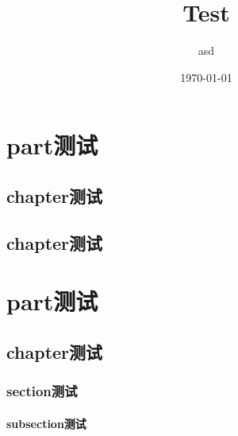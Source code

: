 \documentclass[a4paper]{book}
\begin{document}
 
\begin{CJK}{UTF8}{gkai}
\title{Test}
\author{asd}
\date{\today}
\maketitle
\tableofcontents
\part{part测试}
\chapter{chapter测试}
\chapter{chapter测试}
\part{part测试}
\chapter{chapter测试}
\section{section测试}
\subsection{subsection测试}
\end{CJK}
\end{document}
